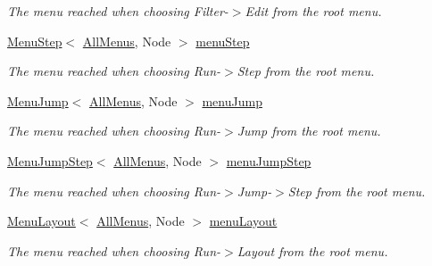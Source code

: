 \begin{DoxyCompactItemize}
\begin{DoxyCompactList}\small\item\em The menu reached when choosing Filter-\/$>$Edit from the root menu. \end{DoxyCompactList}\item 
\hyperlink{structMenuStep}{Menu\+Step}$<$ \hyperlink{structAllMenus}{All\+Menus}, Node $>$ \hyperlink{structAllMenus_a98de0ff50a68c211405d4942fd01e30b}{menu\+Step}\hypertarget{structAllMenus_a98de0ff50a68c211405d4942fd01e30b}{}\label{structAllMenus_a98de0ff50a68c211405d4942fd01e30b}

\begin{DoxyCompactList}\small\item\em The menu reached when choosing Run-\/$>$Step from the root menu. \end{DoxyCompactList}\item 
\hyperlink{structMenuJump}{Menu\+Jump}$<$ \hyperlink{structAllMenus}{All\+Menus}, Node $>$ \hyperlink{structAllMenus_ab61952e51ba624cfebe0076f51ac507e}{menu\+Jump}\hypertarget{structAllMenus_ab61952e51ba624cfebe0076f51ac507e}{}\label{structAllMenus_ab61952e51ba624cfebe0076f51ac507e}

\begin{DoxyCompactList}\small\item\em The menu reached when choosing Run-\/$>$Jump from the root menu. \end{DoxyCompactList}\item 
\hyperlink{structMenuJumpStep}{Menu\+Jump\+Step}$<$ \hyperlink{structAllMenus}{All\+Menus}, Node $>$ \hyperlink{structAllMenus_a9b58d35c1b4f82e78756e04c07b9cbf4}{menu\+Jump\+Step}\hypertarget{structAllMenus_a9b58d35c1b4f82e78756e04c07b9cbf4}{}\label{structAllMenus_a9b58d35c1b4f82e78756e04c07b9cbf4}

\begin{DoxyCompactList}\small\item\em The menu reached when choosing Run-\/$>$Jump-\/$>$Step from the root menu. \end{DoxyCompactList}\item 
\hyperlink{structMenuLayout}{Menu\+Layout}$<$ \hyperlink{structAllMenus}{All\+Menus}, Node $>$ \hyperlink{structAllMenus_af806a447c14dce08d834d4dc2da69ed5}{menu\+Layout}\hypertarget{structAllMenus_af806a447c14dce08d834d4dc2da69ed5}{}\label{structAllMenus_af806a447c14dce08d834d4dc2da69ed5}

\begin{DoxyCompactList}\small\item\em The menu reached when choosing Run-\/$>$Layout from the root menu. \end{DoxyCompactList}\end{DoxyCompactItemize}
